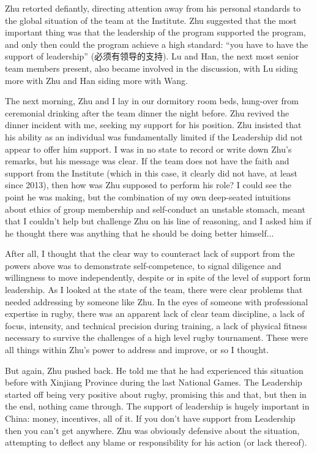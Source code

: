 \begin{CJK}{UTF8}{gbsn}
Zhu retorted defiantly, directing attention away from his personal standards to the global situation of the team at the Institute.  Zhu suggested that the most important thing was that the leadership of the program supported the program, and only then could the program achieve a high standard: ``you have to have the support of leadership'' (必须有领导的支持).  Lu and Han, the next most senior team members present, also became involved in the discussion, with Lu siding more with Zhu and Han siding more with Wang.

The next morning, Zhu and I lay in our dormitory room beds, hung-over from ceremonial drinking after the team dinner the night before.  Zhu revived the dinner incident with me, seeking my support for his position.  Zhu insisted that his ability as an individual was fundamentally limited if the Leadership did not appear to offer him support.  I was in no state to record or write down Zhu's remarks, but his message was clear. If the team does not have the faith and support from the Institute (which in this case, it clearly did not have, at least since 2013), then how was Zhu supposed to perform his role?   I could see the point he was making, but the combination of my own deep-seated intuitions about ethics of group membership and self-conduct an unstable stomach, meant that I couldn't help but challenge Zhu on his line of reasoning, and I asked him if he thought there was anything that he should be doing better himself...

After all, I thought that the clear way to counteract lack of support from the powers above was to demonstrate self-competence, to signal diligence and willingness to move independently, despite or in spite of the level of support form leadership.  As I looked at the state of the team, there were clear problems that needed addressing by someone like Zhu.  In the eyes of someone with professional expertise in rugby, there was an apparent lack of clear team discipline, a lack of focus, intensity, and technical precision during training, a lack of physical fitness necessary to survive the challenges of a high level rugby tournament.  These were all things within Zhu's power to address and improve, or so I thought.

But again, Zhu pushed back.  He told me that he had experienced this situation before with Xinjiang Province during the last National Games.  The Leadership started off being very positive about rugby, promising this and that, but then in the end, nothing came through.  The support of leadership is hugely important in China: money, incentives, all of it.  If you don't have support from Leadership then you can't get anywhere.  Zhu was obviously defensive about the situation, attempting to deflect any blame or responsibility for his action (or lack thereof).


\end{CJK}
